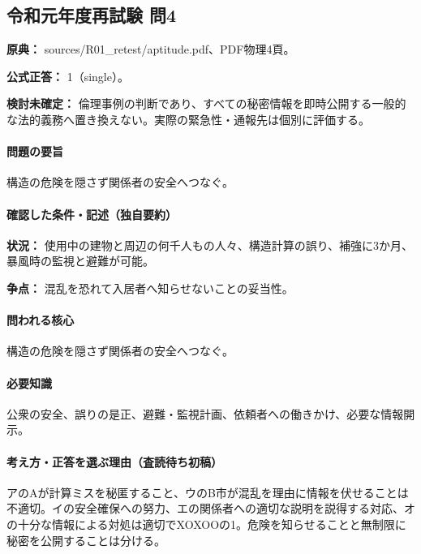 \subsection{令和元年度再試験 問4}
\label{q:r01-ret-apt-04}

\noindent\textbf{原典：} sources/R01\_retest/aptitude.pdf、PDF物理4頁。

\textbf{公式正答：} 1（single）。

\par\textbf{検討未確定：} 倫理事例の判断であり、すべての秘密情報を即時公開する一般的な法的義務へ置き換えない。実際の緊急性・通報先は個別に評価する。

\paragraph{問題の要旨} 構造の危険を隠さず関係者の安全へつなぐ。

\paragraph{確認した条件・記述（独自要約）}\mbox{}\par

\noindent\textbf{状況：} 使用中の建物と周辺の何千人もの人々、構造計算の誤り、補強に3か月、暴風時の監視と避難が可能。\par

\noindent\textbf{争点：} 混乱を恐れて入居者へ知らせないことの妥当性。\par

\paragraph{問われる核心} 構造の危険を隠さず関係者の安全へつなぐ。

\paragraph{必要知識} 公衆の安全、誤りの是正、避難・監視計画、依頼者への働きかけ、必要な情報開示。

\paragraph{考え方・正答を選ぶ理由（査読待ち初稿）} アのAが計算ミスを秘匿すること、ウのB市が混乱を理由に情報を伏せることは不適切。イの安全確保への努力、エの関係者への適切な説明を説得する対応、オの十分な情報による対処は適切でXOXOOの1。危険を知らせることと無制限に秘密を公開することは分ける。


